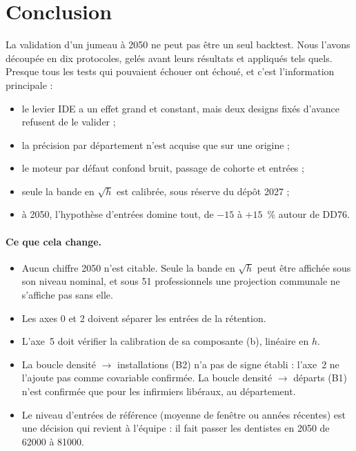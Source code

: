 \section{Conclusion}
La validation d'un jumeau à 2050 ne peut pas être un seul backtest. Nous l'avons découpée en dix
protocoles, gelés avant leurs résultats et appliqués tels quels. Presque tous les tests qui pouvaient
échouer ont échoué, et c'est l'information principale :
\begin{itemize}
  \item le levier IDE a un effet grand et constant, mais deux designs fixés d'avance refusent de le
        valider ;
  \item la précision par département n'est acquise que sur une origine ;
  \item le moteur par défaut confond bruit, passage de cohorte et entrées ;
  \item seule la bande en $\sqrt h$ est calibrée, sous réserve du dépôt 2027 ;
  \item à 2050, l'hypothèse d'entrées domine tout, de $-15$ à $+15$\mesure{}~\% autour de DD76.
\end{itemize}

\paragraph{Ce que cela change.}
\begin{itemize}
  \item Aucun chiffre 2050 n'est citable. Seule la bande en $\sqrt h$ peut être affichée sous son niveau
        nominal, et sous 51 professionnels une projection communale ne s'affiche pas sans elle.
  \item Les axes 0 et 2 doivent séparer les entrées de la rétention.
  \item L'axe~5 doit vérifier la calibration de sa composante (b), linéaire en $h$.
  \item La boucle densité $\to$ installations (B2) n'a pas de signe établi : l'axe~2 ne l'ajoute pas comme
        covariable confirmée. La boucle densité $\to$ départs (B1) n'est confirmée que pour les
        infirmiers libéraux, au département.
  \item Le niveau d'entrées de référence (moyenne de fenêtre ou années récentes) est une décision qui
        revient à l'équipe : il fait passer les dentistes en 2050 de \num{62000} à \num{81000}\mesure{}.
\end{itemize}

